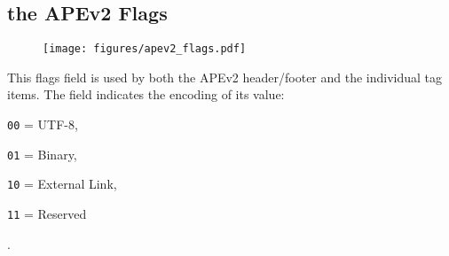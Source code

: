 \subsection{the APEv2 Flags}
\begin{figure}[h]
\texttt{[image: figures/apev2\_flags.pdf]}
\end{figure}
\par
\noindent
This flags field is used by both the APEv2 header/footer and the
individual tag items.
The  field indicates the encoding of its value:

\begin{inparaenum}
\item[\texttt{00} = ] UTF-8,
\item[\texttt{01} = ] Binary,
\item[\texttt{10} = ] External Link,
\item[\texttt{11} = ] Reserved
\end{inparaenum}
.
